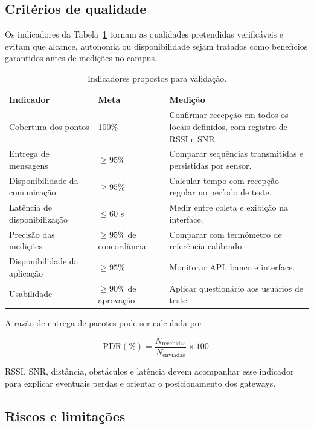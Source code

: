 \documentclass[10pt,a4paper,twocolumn]{article}
\begin{document}
\subsection{Critérios de qualidade}

Os indicadores da Tabela~\ref{tab:indicadores} tornam as qualidades pretendidas
verificáveis e evitam que alcance, autonomia ou disponibilidade sejam tratados
como benefícios garantidos antes de medições no campus.

\begin{table}[t]
\centering
\caption{Indicadores propostos para validação.}
\label{tab:indicadores}
\begin{tabularx}{\textwidth}{@{}p{3.2cm}p{2.5cm}X@{}}
\toprule
\textbf{Indicador} & \textbf{Meta} & \textbf{Medição} \\
\midrule
Cobertura dos pontos & 100\% & Confirmar recepção em todos os locais
definidos, com registro de RSSI e SNR. \\
Entrega de mensagens & $\geq 95\%$ & Comparar sequências transmitidas e
persistidas por sensor. \\
Disponibilidade da comunicação & $\geq 95\%$ & Calcular tempo com recepção
regular no período de teste. \\
Latência de disponibilização & $\leq 60$ s & Medir entre coleta e exibição na
interface. \\
Precisão das medições & $\geq 95\%$ de concordância & Comparar com termômetro
de referência calibrado. \\
Disponibilidade da aplicação & $\geq 95\%$ & Monitorar API, banco e interface. \\
Usabilidade & $\geq 90\%$ de aprovação & Aplicar questionário aos usuários de
teste. \\
\bottomrule
\end{tabularx}
\end{table}

A razão de entrega de pacotes pode ser calculada por

\begin{equation}
\mathrm{PDR}(\%) =
\frac{N_{\mathrm{recebidas}}}{N_{\mathrm{enviadas}}}\times 100.
\end{equation}

RSSI, SNR, distância, obstáculos e latência devem acompanhar esse indicador para
explicar eventuais perdas e orientar o posicionamento dos gateways.

\subsection{Riscos e limitações}
\end{document}

